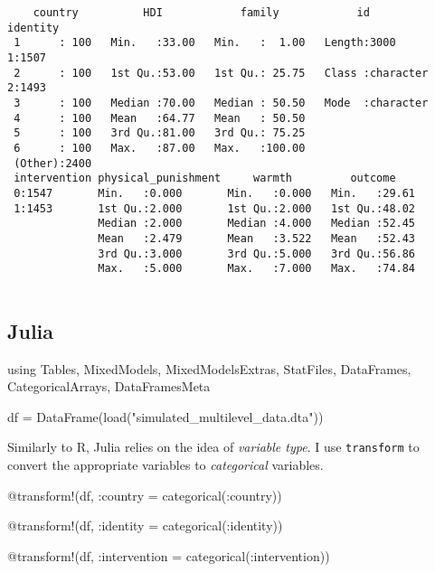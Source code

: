 \documentclass[
  letterpaper,
  DIV=11,
  numbers=noendperiod]{scrreprt}
\newenvironment{Shaded}{\begin{snugshade}}{\end{snugshade}}
\newcommand{\BuiltInTok}[1]{\textcolor[rgb]{0.00,0.23,0.31}{#1}}
\newcommand{\FunctionTok}[1]{\textcolor[rgb]{0.28,0.35,0.67}{#1}}
\newcommand{\ImportTok}[1]{\textcolor[rgb]{0.00,0.46,0.62}{#1}}
\newcommand{\NormalTok}[1]{\textcolor[rgb]{0.00,0.23,0.31}{#1}}
\newcommand{\OperatorTok}[1]{\textcolor[rgb]{0.37,0.37,0.37}{#1}}
\newcommand{\PreprocessorTok}[1]{\textcolor[rgb]{0.68,0.00,0.00}{#1}}
\newcommand{\StringTok}[1]{\textcolor[rgb]{0.13,0.47,0.30}{#1}}
\begin{document}
\begin{verbatim}
    country          HDI            family            id            identity
 1      : 100   Min.   :33.00   Min.   :  1.00   Length:3000        1:1507  
 2      : 100   1st Qu.:53.00   1st Qu.: 25.75   Class :character   2:1493  
 3      : 100   Median :70.00   Median : 50.50   Mode  :character           
 4      : 100   Mean   :64.77   Mean   : 50.50                              
 5      : 100   3rd Qu.:81.00   3rd Qu.: 75.25                              
 6      : 100   Max.   :87.00   Max.   :100.00                              
 (Other):2400                                                               
 intervention physical_punishment     warmth         outcome     
 0:1547       Min.   :0.000       Min.   :0.000   Min.   :29.61  
 1:1453       1st Qu.:2.000       1st Qu.:2.000   1st Qu.:48.02  
              Median :2.000       Median :4.000   Median :52.45  
              Mean   :2.479       Mean   :3.522   Mean   :52.43  
              3rd Qu.:3.000       3rd Qu.:5.000   3rd Qu.:56.86  
              Max.   :5.000       Max.   :7.000   Max.   :74.84  
                                                                 
\end{verbatim}

\subsection{Julia}

\begin{Shaded}
\begin{Highlighting}[]
\ImportTok{using} \BuiltInTok{Tables}\NormalTok{, }\BuiltInTok{MixedModels}\NormalTok{, }\BuiltInTok{MixedModelsExtras}\NormalTok{, }\BuiltInTok{StatFiles}\NormalTok{, }\BuiltInTok{DataFrames}\NormalTok{, }\BuiltInTok{CategoricalArrays}\NormalTok{, }\BuiltInTok{DataFramesMeta}

\NormalTok{df }\OperatorTok{=} \FunctionTok{DataFrame}\NormalTok{(}\FunctionTok{load}\NormalTok{(}\StringTok{"simulated\_multilevel\_data.dta"}\NormalTok{))}
\end{Highlighting}
\end{Shaded}

Similarly to R, Julia relies on the idea of \emph{variable type}. I use
\texttt{transform} to convert the appropriate variables to
\emph{categorical} variables.

\begin{Shaded}
\begin{Highlighting}[]
\PreprocessorTok{@transform}\NormalTok{!(df, }\OperatorTok{:}\NormalTok{country }\OperatorTok{=} \FunctionTok{categorical}\NormalTok{(}\OperatorTok{:}\NormalTok{country))}

\PreprocessorTok{@transform}\NormalTok{!(df, }\OperatorTok{:}\NormalTok{identity }\OperatorTok{=} \FunctionTok{categorical}\NormalTok{(}\OperatorTok{:}\NormalTok{identity))}

\PreprocessorTok{@transform}\NormalTok{!(df, }\OperatorTok{:}\NormalTok{intervention }\OperatorTok{=} \FunctionTok{categorical}\NormalTok{(}\OperatorTok{:}\NormalTok{intervention))}
\end{Highlighting}
\end{Shaded}
\end{document}
